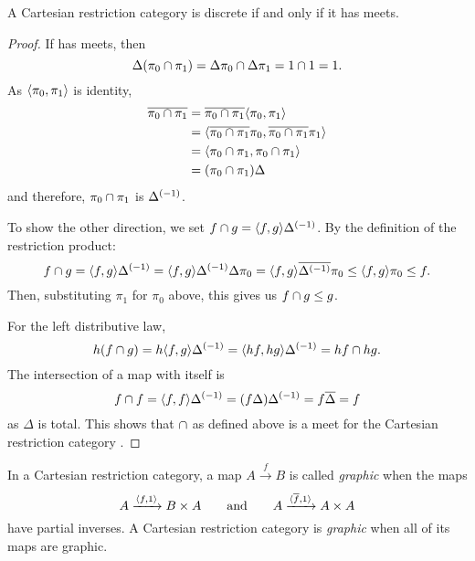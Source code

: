 \begin{theorem}\label{thm:a_crc_is_discrete_iff_it_has_meets}
  A Cartesian restriction category \X is discrete if and only if it has meets.
\end{theorem}
\begin{proof}
  If \X has meets, then
  \[
    \Delta(\pi_0 \cap \pi_1) = \Delta\pi_0 \cap \Delta\pi_1 = 1\cap 1 = 1.
  \]
  As $\langle\pi_0,\pi_1\rangle$ is identity,
  \begin{align*}
    \overline{\pi_0 \cap \pi_1} &= \overline{\pi_0 \cap \pi_1} \langle\pi_0, \pi_1\rangle \\
    &=\langle\overline{\pi_0 \cap \pi_1}\pi_0, \overline{\pi_0 \cap \pi_1}\pi_1\rangle\\
    &=\langle\pi_0 \cap \pi_1,\pi_0 \cap \pi_1\rangle\\
    &=(\pi_0 \cap \pi_1 )\Delta
  \end{align*}
  and therefore, $\pi_0 \cap \pi_1$ is ${\Delta}^{(-1)}$.

  To show the other direction, we set $f\cap g = \langle f,g\rangle{\Delta}^{(-1)}$.
  By the definition of the restriction product:
  \[
    f \cap g =  \langle f,g\rangle{\Delta}^{(-1)} =\langle f,g\rangle{\Delta}^{(-1)} \Delta \pi_0 =
      \langle f,g\rangle\overline{{\Delta}^{(-1)}}\pi_0 \le \langle f,g\rangle\pi_0 \le f.
  \]
  Then, substituting $\pi_1$ for $\pi_0$ above, this gives us $f \cap g \le g$.

  For the left distributive law,
  \[
    h(f \cap g) = h \langle f,g\rangle{\Delta}^{(-1)} =  \langle h f,h g\rangle{\Delta}^{(-1)} = h f \cap h g.
  \]
  The intersection of a map with itself is
  \[
    f\cap f = \langle f,f\rangle {\Delta}^{(-1)} = (f \Delta) {\Delta}^{(-1)} = f \overline{\Delta} = f
  \]
  as $\Delta$ is total. This shows that $\cap$ as defined above is a meet for the
  Cartesian restriction category \X.

\end{proof}

\begin{definition}\label{def:graphic_map}
  In a Cartesian restriction category, a map $A\xrightarrow{f}B$ is called \emph{graphic} when the
  maps
  \[
    A\xrightarrow{\langle f,1\rangle}B\times A\qquad \text{and}\qquad
    A\xrightarrow{\langle\overline{f},1\rangle}A\times A
  \]
  have partial inverses. A Cartesian restriction category is \emph{graphic} when all of its maps
  are graphic.
\end{definition}

